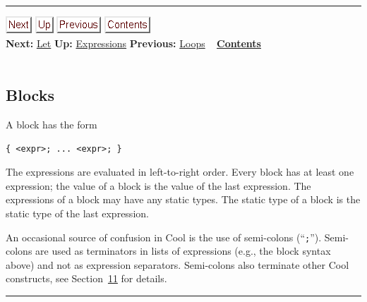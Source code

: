 \documentclass[]{article}
\begin{document}
\begin{center}\rule{3in}{0.4pt}\end{center}

\href{node21.html}{\includegraphics{next.png}}
\href{node13.html}{\includegraphics{up.png}}
\href{node19.html}{\includegraphics{prev.png}}
\href{node1.html}{\includegraphics{contents.png}} \\ \textbf{Next:}
\href{node21.html}{Let} \textbf{Up:} \href{node13.html}{Expressions}
\textbf{Previous:} \href{node19.html}{Loops} ~
\textbf{\href{node1.html}{Contents}} \\ \\

\subsection{Blocks}

A block has the form

\begin{verbatim}
{ <expr>; ... <expr>; }
\end{verbatim}

The expressions are evaluated in left-to-right order. Every block has at
least one expression; the value of a block is the value of the last
expression. The expressions of a block may have any static types. The
static type of a block is the static type of the last expression.

An occasional source of confusion in Cool is the use of semi-colons
(``\texttt{;}''). Semi-colons are used as terminators in lists of
expressions (e.g., the block syntax above) and not as expression
separators. Semi-colons also terminate other Cool constructs, see
Section~\href{node39.html\#sec-gram}{11} for details.

\begin{center}\rule{3in}{0.4pt}\end{center}
\end{document}
